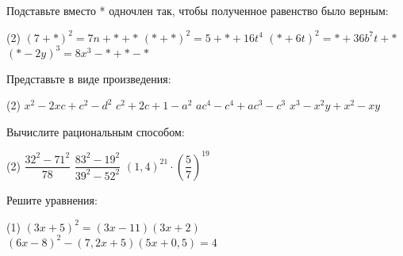 \begin{exam}
	\begin{listofex}
		\item Подставьте вместо * одночлен так, чтобы полученное равенство было верным:
		\begin{tasks}(2)
			\task \( (7+*)^2=7n+*+* \)
			\task \( (*+*)^2=5+*+16t^4 \)
			\task \( (*+6t)^2=*+36b^7t+* \)
			\task \( (*-2y)^3=8x^3-*+*-* \)
		\end{tasks}
		
		\item Представьте в виде произведения:
		\begin{tasks}(2)
			\task \( x^2-2xc+c^2-d^2 \)
			\task \( c^2+2c+1-a^2 \)
			\task \( ac^4-c^4+ac^3-c^3 \)
			\task \( x^3-x^2y+x^2-xy \)
		\end{tasks}
		\item Вычислите рациональным способом:
		\begin{tasks}(2)
			\task \( \dfrac{32^2-71^2}{78}  \)
			\task \( \dfrac{83^2-19^2}{39^2-52^2} \)
			\task \( (1,4)^{21} \cdot \left( \dfrac{5}{7} \right)^{19} \)
		\end{tasks}
		\item Решите уравнения:
		\begin{tasks}(1)
			\task \( (3x+5)^2= (3x-11)(3x+2) \)
			\task \( (6x-8)^2 - (7,2x+5)(5x+0,5)=4 \)
		\end{tasks}
	\end{listofex}
\end{exam}
